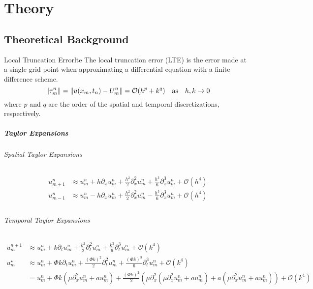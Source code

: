 \chapter{Theory}

\section{Theoretical Background}

\begin{definition}{Local Truncation Error}{lte}
  The local truncation error (LTE) is the error made at a single grid point when approximating a differential equation with a finite difference scheme.
  \[
    \lVert\tau_m^n\rVert = \lVert u(x_m, t_n) - U_m^n\rVert = \mathcal{O}(h^p + k^q) \quad \text{as} \quad h, k \to 0 
  \]
  where \(p\) and \(q\) are the order of the spatial and temporal discretizations, respectively.
\end{definition}


\paragraph{Taylor Expansions}

\subparagraph{Spatial Taylor Expansions}
\begin{align*}
  u_{m+1}^n & \approx u_m^n + h \partial_x u_m^n + \frac{h^2}{2} \partial_x^2 u_m^n + \frac{h^3}{6} \partial_x^3 u_m^n + \mathcal{O}(h^4) \\
  u_{m-1}^n & \approx u_m^n - h \partial_x u_m^n + \frac{h^2}{2} \partial_x^2 u_m^n - \frac{h^3}{6} \partial_x^3 u_m^n + \mathcal{O}(h^4) \\
\end{align*}

\subparagraph{Temporal Taylor Expansions}
\begin{align*}
  u_m^{n+1} & \approx u_m^n + k \partial_t u_m^n + \frac{k^2}{2} \partial_t^2 u_m^n + \frac{k^3}{6} \partial_t^3 u_m^n + \mathcal{O}(k^4)                                                                                                            \\
  u_m^\star & \approx u_m^n + \Phi k \partial_t u_m^n + \frac{(\Phi k)^2}{2} \partial_t^2 u_m^n + \frac{(\Phi k)^3}{6} \partial_t^3 u_m^n + \mathcal{O}(k^4)                                                                                         \\
            & = u_m^n + \Phi k \left(\mu \partial_x^2 u_m^n + a u_m^n\right) + \frac{(\Phi k)^2}{2} \left(\mu \partial_x^2 \left(\mu \partial_x^2 u_m^n + a u_m^n\right) + a \left(\mu \partial_x^2 u_m^n + a u_m^n\right)\right) + \mathcal{O}(k^4) \\
\end{align*}

